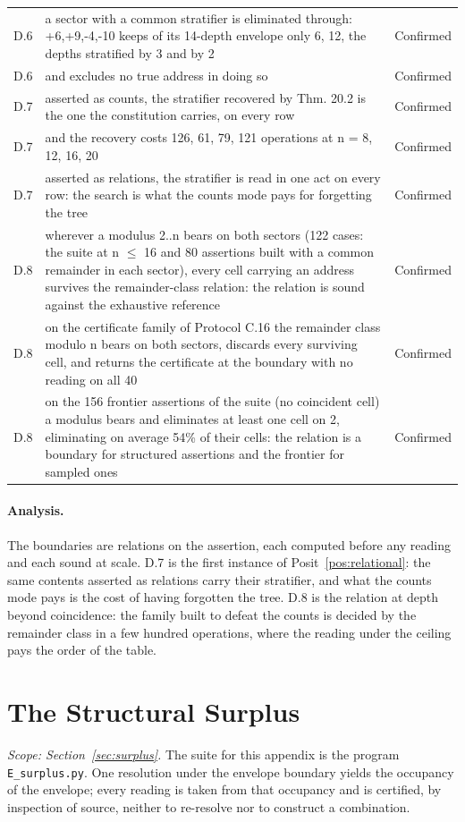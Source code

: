 \documentclass[pdflatex,sn-mathphys-num]{sn-jnl}
\theoremstyle{thmstyleone}%
\theoremstyle{thmstyletwo}%
\theoremstyle{thmstylethree}%
\begin{document}
\begin{appendices}
\begin{longtable}{@{} p{} p{} p{} @{}}
D.6 & a sector with a common stratifier is eliminated through: {+6,+9,-4,-10} keeps of its 14-depth envelope only {6, 12}, the depths stratified by 3 and by 2 & Confirmed \\
D.6 & and excludes no true address in doing so & Confirmed \\
D.7 & asserted as counts, the stratifier recovered by Thm. 20.2 is the one the constitution carries, on every row & Confirmed \\
D.7 & and the recovery costs 126, 61, 79, 121 operations at n = 8, 12, 16, 20 & Confirmed \\
D.7 & asserted as relations, the stratifier is read in one act on every row: the search is what the counts mode pays for forgetting the tree & Confirmed \\
D.8 & wherever a modulus 2..n bears on both sectors (122 cases: the suite at n $\le$ 16 and 80 assertions built with a common remainder in each sector), every cell carrying an address survives the remainder-class relation: the relation is sound against the exhaustive reference & Confirmed \\
D.8 & on the certificate family of Protocol C.16 the remainder class modulo n bears on both sectors, discards every surviving cell, and returns the certificate at the boundary with no reading on all 40 & Confirmed \\
D.8 & on the 156 frontier assertions of the suite (no coincident cell) a modulus bears and eliminates at least one cell on 2, eliminating on average 54\% of their cells: the relation is a boundary for structured assertions and the frontier for sampled ones & Confirmed \\
\end{longtable}\endgroup

\paragraph{Analysis.} The boundaries are relations on the assertion, each computed before any reading and each sound at scale. D.7 is the first instance of Posit~\ref{pos:relational}: the same contents asserted as relations carry their stratifier, and what the counts mode pays is the cost of having forgotten the tree. D.8 is the relation at depth beyond coincidence: the family built to defeat the counts is decided by the remainder class in a few hundred operations, where the reading under the ceiling pays the order of the table.

\section{The Structural Surplus}\label{app:E}
\emph{Scope: Section~\ref{sec:surplus}.} The suite for this appendix is the program \texttt{E\_surplus.py}. One resolution under the envelope boundary yields the occupancy of the envelope; every reading is taken from that occupancy and is certified, by inspection of source, neither to re-resolve nor to construct a combination.


\end{appendices}
\end{document}
